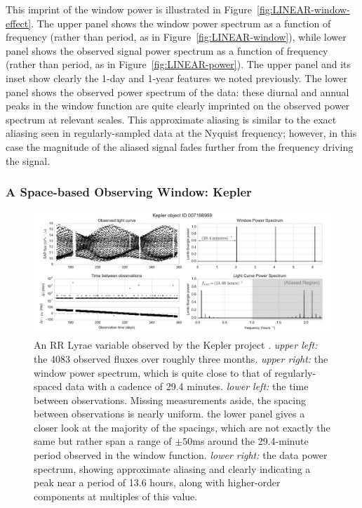 \documentclass[preprint]{aastex}
\newcommand{\fig}[1]{Figure~\ref{fig:#1}}
\newcommand{\figlabel}[1]{\label{fig:#1}}
\begin{document}
This imprint of the window power is illustrated in \fig{LINEAR-window-effect}.
The upper panel shows the window power spectrum as a function of frequency
(rather than period, as in \fig{LINEAR-window}),
while lower panel shows the observed
signal power spectrum as a function of frequency
(rather than period, as in \fig{LINEAR-power}).
The upper panel and its inset show clearly the 1-day and 1-year features we
noted previously.
The lower panel shows the observed power spectrum of the data: these diurnal
and annual peaks in the window function are quite clearly imprinted on the
observed power spectrum at relevant scales.
This approximate aliasing is similar to the exact aliasing seen in
regularly-sampled data at the Nyquist frequency; however, in this case
the magnitude of the aliased signal fades further from the frequency
driving the signal.


\subsubsection{A Space-based Observing Window: Kepler}

\begin{figure}[ht]
  \centering
  \includegraphics[width=\textwidth]{fig16_kepler_data}
  \caption{An RR Lyrae variable observed by the Kepler project \citep[see][]{Kolenberg2010}.
    {\it upper left:} the 4083 observed fluxes over roughly three months.
    {\it upper right:} the window power spectrum, which is quite close to that of regularly-spaced data with a cadence of 29.4 minutes.
    {\it lower left:} the time between observations. Missing measurements aside, the spacing between observations is nearly uniform. the lower panel gives a closer look at the majority of the spacings, which are not exactly the same but rather span a range of $\pm 50$ms around the 29.4-minute period observed in the window function.
    {\it lower right:} the data power spectrum, showing approximate aliasing and clearly indicating a peak near a period of 13.6 hours, along with higher-order components at multiples of this value.
    \figlabel{kepler-data}}
\end{figure}
\end{document}
